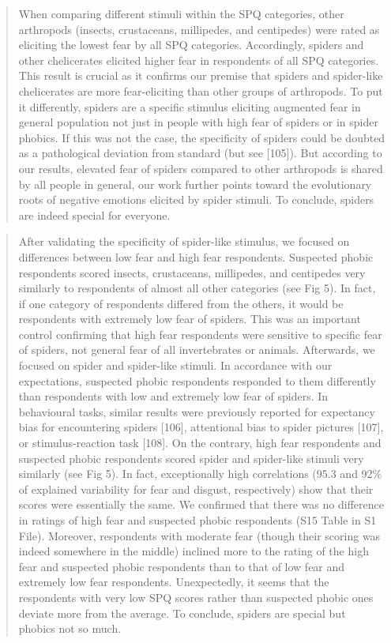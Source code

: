 \documentclass[
]{book}
\begin{document}
\begin{quote}
When comparing different stimuli within the SPQ categories, other arthropods (insects, crustaceans, millipedes, and centipedes) were rated as eliciting the lowest fear by all SPQ categories. Accordingly, spiders and other chelicerates elicited higher fear in respondents of all SPQ categories. This result is crucial as it confirms our premise that spiders and spider-like chelicerates are more fear-eliciting than other groups of arthropods. To put it differently, spiders are a specific stimulus eliciting augmented fear in general population not just in people with high fear of spiders or in spider phobics. If this was not the case, the specificity of spiders could be doubted as a pathological deviation from standard (but see {[}105{]}). But according to our results, elevated fear of spiders compared to other arthropods is shared by all people in general, our work further points toward the evolutionary roots of negative emotions elicited by spider stimuli. To conclude, spiders are indeed special for everyone.
\end{quote}

\begin{quote}
After validating the specificity of spider-like stimulus, we focused on differences between low fear and high fear respondents. Suspected phobic respondents scored insects, crustaceans, millipedes, and centipedes very similarly to respondents of almost all other categories (see Fig 5). In fact, if one category of respondents differed from the others, it would be respondents with extremely low fear of spiders. This was an important control confirming that high fear respondents were sensitive to specific fear of spiders, not general fear of all invertebrates or animals. Afterwards, we focused on spider and spider-like stimuli. In accordance with our expectations, suspected phobic respondents responded to them differently than respondents with low and extremely low fear of spiders. In behavioural tasks, similar results were previously reported for expectancy bias for encountering spiders {[}106{]}, attentional bias to spider pictures {[}107{]}, or stimulus-reaction task {[}108{]}. On the contrary, high fear respondents and suspected phobic respondents scored spider and spider-like stimuli very similarly (see Fig 5). In fact, exceptionally high correlations (95.3 and 92\% of explained variability for fear and disgust, respectively) show that their scores were essentially the same. We confirmed that there was no difference in ratings of high fear and suspected phobic respondents (S15 Table in S1 File). Moreover, respondents with moderate fear (though their scoring was indeed somewhere in the middle) inclined more to the rating of the high fear and suspected phobic respondents than to that of low fear and extremely low fear respondents. Unexpectedly, it seems that the respondents with very low SPQ scores rather than suspected phobic ones deviate more from the average. To conclude, spiders are special but phobics not so much.
\end{quote}
\end{document}
